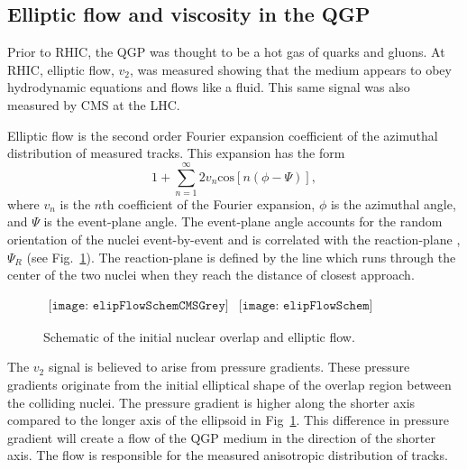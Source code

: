     \subsection{Elliptic flow and viscosity in the QGP \label{sec:elipFlow}}
      Prior to RHIC, the QGP was thought to be a hot gas of quarks and gluons.
      At RHIC, elliptic flow, $v_{2}$, was measured showing that the medium 
        appears to obey hydrodynamic equations and flows like a fluid.
      This same signal was also measured by CMS \cite{cmsFlow} at the LHC. 

      Elliptic flow is the second order Fourier expansion coefficient  
        of the azimuthal distribution of measured tracks.
      This expansion has the form
      \begin{equation}
        1+\sum^{\infty}_{n=1}2v_{n}\mathrm{cos}\left[n\left(\phi-\Psi\right)\right],
        \label{eg:v2Expand}
      \end{equation}
        where $v_{n}$ is the $n$th coefficient of the Fourier expansion, $\phi$
        is the azimuthal angle, and $\Psi$ is the event-plane angle.
      The event-plane angle accounts for the random orientation of the 
        nuclei event-by-event and is correlated with the reaction-plane
        , $\Psi_{R}$ (see Fig.~\ref{fig:elipSchem}).
      The reaction-plane is defined by the line which runs through the center
        of the two nuclei when they reach the distance of closest approach. 
      \begin{figure}[!Hhbt]
        \centering
        $ \begin{array}{cc}
        \texttt{[image: elipFlowSchemCMSGrey]} &
        \texttt{[image: elipFlowSchem]}
        \end{array} $
        \caption{Schematic of the initial nuclear overlap and elliptic flow.}
        \label{fig:elipSchem}
      \end{figure}
  
      The $v_{2}$ signal is believed to arise from pressure gradients.
      These pressure gradients originate from the initial elliptical shape of 
        the overlap region between the colliding nuclei. 
      The pressure gradient is higher along the shorter axis compared to 
        the longer axis of the ellipsoid in Fig~\ref{fig:elipSchem}.
      This difference in pressure gradient will create a flow of the QGP 
        medium in the direction of the shorter axis. 
      The flow is responsible for the measured anisotropic distribution of 
        tracks. 

